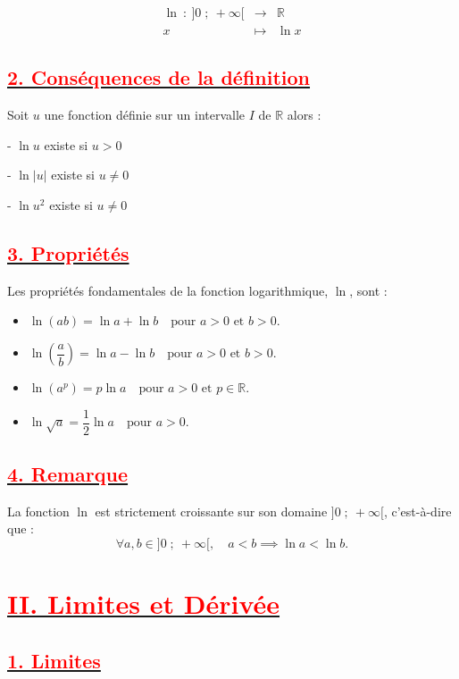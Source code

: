 \documentclass[12pt,a4paper]{article}
\begin{document}
$$\begin{array}{rcl}
\ln\ :\ ]0\;;\ +\infty[ & \longrightarrow & \mathbb{R} \\
x & \longmapsto & \ln x
\end{array}$$
\subsection*{\underline{\textbf{\textcolor{red}{2. Conséquences de la définition}}}}
Soit $u$ une fonction définie sur un intervalle $I$ de $\mathbb{R}$ alors :

- $\ln u$ existe si $u > 0$

- $\ln |u|$ existe si $u \neq 0$

- $\ln u^{2}$ existe si $u \neq 0$

\subsection*{\underline{\textbf{\textcolor{red}{3. Propriétés}}}}
Les propriétés fondamentales de la fonction logarithmique, $\ln$, sont :
\begin{itemize}
    \item 
    \(
    \ln(ab) = \ln a + \ln b \quad \text{pour } a > 0 \text{ et } b > 0.
    \)
    \item 
    \(
    \ln\left(\dfrac{a}{b}\right) = \ln a - \ln b \quad \text{pour } a > 0 \text{ et } b > 0.
    \)
    \item 
    \(
    \ln(a^p) = p \ln a \quad \text{pour } a > 0 \text{ et } p \in \mathbb{R}.
    \)
    \item 
    \(
    \ln\sqrt{a} = \dfrac{1}{2} \ln a \quad \text{pour } a > 0.
    \)
\end{itemize}

\subsection*{\underline{\textbf{\textcolor{red}{4. Remarque}}}}
La fonction $\ln$ est strictement croissante sur son domaine $]0\;;\ +\infty[$, c'est-à-dire que :
\[
\forall a, b \in ]0\;;\ +\infty[, \quad a < b \implies \ln a < \ln b.
\]

\section*{\underline{\textbf{\textcolor{red}{II. Limites et Dérivée}}}}
\subsection*{\underline{\textbf{\textcolor{red}{1. Limites }}}}
\end{document}
